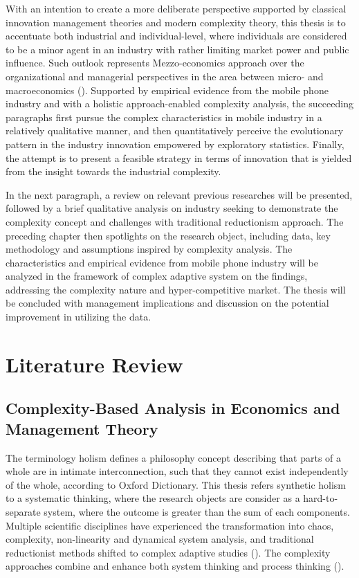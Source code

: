 \documentclass[utf8,english]{gradu3}
\begin{document}
With an intention to create a more deliberate perspective supported by classical innovation management theories and modern complexity theory, this thesis is to accentuate both industrial and individual-level, where individuals are considered to be a minor agent in an industry with rather limiting market power and public influence. Such outlook represents Mezzo-economics approach over the organizational and managerial perspectives in the area between micro- and macroeconomics (\cite{kozuharov2011mezzo}). Supported by empirical evidence from the mobile phone industry and with a holistic approach-enabled complexity analysis, the succeeding paragraphs first pursue the complex characteristics in mobile industry in a relatively qualitative manner, and then quantitatively perceive the evolutionary pattern in the industry innovation empowered by exploratory statistics. Finally, the attempt is to present a feasible strategy in terms of innovation that is yielded from the insight towards the industrial complexity. 

In the next paragraph, a review on relevant previous researches will be presented, followed by a brief qualitative analysis on industry seeking to demonstrate the complexity concept and challenges with traditional reductionism approach. The preceding chapter then spotlights on the research object, including data, key methodology and assumptions inspired by complexity analysis. The characteristics and empirical evidence from mobile phone industry will be analyzed in the framework of complex adaptive system on the findings, addressing the complexity nature and hyper-competitive market. The thesis will be concluded with management implications and discussion on the potential improvement in utilizing the data.

\chapter{Literature Review}

\section{Complexity-Based Analysis in Economics and Management Theory}

The terminology holism defines a philosophy concept describing that parts of a whole are in intimate interconnection, such that they cannot exist independently of the whole, according to Oxford Dictionary. This thesis refers synthetic holism to a systematic thinking, where the research objects are consider as a hard-to-separate system, where the outcome is greater than the sum of each components. Multiple scientific disciplines have experienced the transformation into chaos, complexity, non-linearity and dynamical system analysis, and traditional reductionist methods shifted to complex adaptive studies (\cite{urry2005complexity}). The complexity approaches combine and enhance both system thinking and process thinking (\cite{thrift1999place}). 
\end{document}
